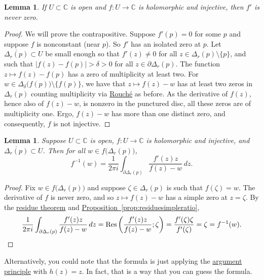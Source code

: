 \documentclass[12pt,openany]{book}
\newcommand{\sabs}[1]{\lvert {#1} \rvert}
\newcommand{\C}{{\mathbb{C}}}
\theoremstyle{plain}
\newtheorem{lemma}[thm]{Lemma}
\theoremstyle{remark}
\theoremstyle{definition}
\theoremstyle{exercise}
\theoremstyle{example}
\newcommand{\propref}[1]{\hyperref[#1]{Proposition~\ref*{#1}}}
\begin{document}
\begin{lemma} \label{lemma:dernonzero}
If $U \subset \C$ is open and $f \colon U \to \C$ is holomorphic and injective, then
$f'$ is never zero.
\end{lemma}

\begin{proof}
We will prove the contrapositive.
Suppose $f'(p) = 0$ for some $p$
and suppose $f$ is nonconstant (near $p$).
So $f'$ has
an isolated zero at $p$.
Let $\overline{\Delta_r(p)} \subset U$
be small enough so that $f'(z) \not= 0$ for all $z \in \Delta_r(p) \setminus \{ p \}$,
and such that $\sabs{f(z)-f(p)} > \delta > 0$ for all $z \in \partial
\Delta_r(p)$.
The function $z \mapsto f(z) - f(p)$ has a zero of multiplicity at least
two.
For $w \in \Delta_{\delta}\bigl(f(p)\bigr) \setminus \bigl\{ f(p) \bigr\}$,
we have that
$z \mapsto f(z)-w$ has at least two zeros in $\Delta_r(p)$ counting multiplicity via
\hyperref[thm:rouche2]{Rouch\'e} as
before.  As the derivative of $f(z)$, hence also of $f(z)-w$, is nonzero in
the punctured disc, all these zeros are of multiplicity one.  Ergo, $f(z)-w$
has more than one distinct zero, and consequently, $f$ is not injective.
\end{proof}

\begin{lemma} \label{lemma:inverseasintegral}
Suppose $U \subset \C$ is open,
$f \colon U \to \C$ is holomorphic and injective, and
$\overline{\Delta_r(p)} \subset U$.  Then for all $w \in
f\bigl(\Delta_r(p)\bigr)$,
\begin{equation*}
f^{-1}(w) = \frac{1}{2\pi i} \int_{\partial \Delta_r(p)}
\frac{f'(z)z}{f(z)-w} \, dz .
\end{equation*}
\end{lemma}

\begin{proof}
Fix $w \in f\bigl(\Delta_r(p)\bigr)$ and suppose $\zeta \in \Delta_r(p)$
is such that $f(\zeta) = w$.
The derivative of $f$ is never zero, and so $z \mapsto f(z)-w$ has a simple
zero at $z=\zeta$.  By the \hyperref[thm:residue]{residue theorem} and
\propref{prop:residuesimpleratio},
\begin{equation*}
\frac{1}{2\pi i} \int_{\partial \Delta_r(p)}
\frac{f'(z)z}{f(z)-w} \, dz
=
\operatorname{Res}\left(\frac{f'(z)z}{f(z)-w};\zeta\right)
=
\frac{f'(\zeta)\zeta}{f'(\zeta)} = \zeta = f^{-1}(w) .
\qedhere
\end{equation*}
\end{proof}

Alternatively, you could note that the formula is just applying the
\hyperref[thm:argprinc]{argument principle} with $h(z)=z$.
In fact, that is a way that you can guess the formula.
\end{document}
